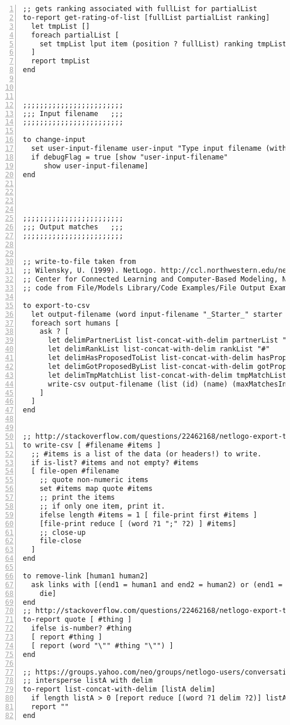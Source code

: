 \begin{lstlisting}[numbers=left, breaklines=true]
;; gets ranking associated with fullList for partialList
to-report get-rating-of-list [fullList partialList ranking]
  let tmpList []
  foreach partialList [
    set tmpList lput item (position ? fullList) ranking tmpList
  ]
  report tmpList
end



;;;;;;;;;;;;;;;;;;;;;;;;
;;; Input filename   ;;;
;;;;;;;;;;;;;;;;;;;;;;;;

to change-input
  set user-input-filename user-input "Type input filename (without extension)."
  if debugFlag = true [show "user-input-filename"
     show user-input-filename]
end




;;;;;;;;;;;;;;;;;;;;;;;;
;;; Output matches   ;;;
;;;;;;;;;;;;;;;;;;;;;;;;


;; write-to-file taken from
;; Wilensky, U. (1999). NetLogo. http://ccl.northwestern.edu/netlogo/.
;; Center for Connected Learning and Computer-Based Modeling, Northwestern University, Evanston, IL
;; code from File/Models Library/Code Examples/File Output Example

to export-to-csv
  let output-filename (word input-filename "_Starter_" starter "_Switch_" switching "_Ticks_" ticks ".csv")
  foreach sort humans [
    ask ? [
      let delimPartnerList list-concat-with-delim partnerList "#"
      let delimRankList list-concat-with-delim rankList "#"
      let delimHasProposedToList list-concat-with-delim hasProposedToList "#"
      let delimGotProposedByList list-concat-with-delim gotProposedByList "#"
      let delimTmpMatchList list-concat-with-delim tmpMatchList "#"
      write-csv output-filename (list (id) (name) (maxMatchesInt) (sideInt) (delimPartnerList) (delimRankList) (delimHasProposedToList) (delimGotProposedByList) (delimTmpMatchList) (activeFlag))
    ]
  ]
end


;; http://stackoverflow.com/questions/22462168/netlogo-export-tableau-issues
to write-csv [ #filename #items ]
  ;; #items is a list of the data (or headers!) to write.
  if is-list? #items and not empty? #items
  [ file-open #filename
    ;; quote non-numeric items
    set #items map quote #items
    ;; print the items
    ;; if only one item, print it.
    ifelse length #items = 1 [ file-print first #items ]
    [file-print reduce [ (word ?1 ";" ?2) ] #items]
    ;; close-up
    file-close
  ]
end

to remove-link [human1 human2]
  ask links with [(end1 = human1 and end2 = human2) or (end1 = human2 and end2 = human1)] [
    die]
end
;; http://stackoverflow.com/questions/22462168/netlogo-export-tableau-issues
to-report quote [ #thing ]
  ifelse is-number? #thing
  [ report #thing ]
  [ report (word "\"" #thing "\"") ]
end

;; https://groups.yahoo.com/neo/groups/netlogo-users/conversations/topics/6490
;; intersperse listA with delim
to-report list-concat-with-delim [listA delim]
  if length listA > 0 [report reduce [(word ?1 delim ?2)] listA]
  report ""
end
\end{lstlisting}